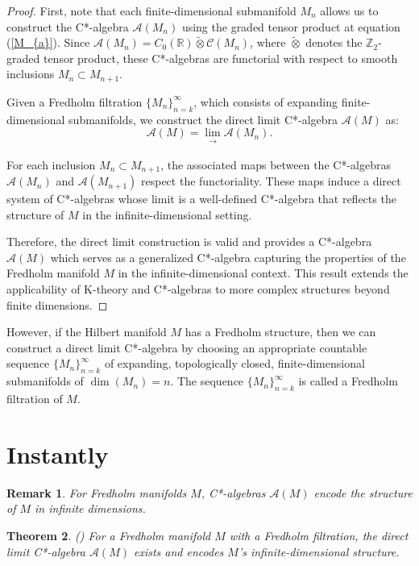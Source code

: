 \documentclass[11pt, twoside, a4paper]{article}
\theoremstyle{mytheoremstyle}
\newtheorem{theorem}{Theorem}[section]
\newtheorem{remark}[theorem]{Remark}
\begin{document}
\begin{proof}
First, note that each finite-dimensional submanifold \( M_{n} \) allows us to construct the C*-algebra \( \mathcal{A}(M_{n}) \) using the graded tensor product at equation ({\color{blue}\ref{M_{a}}}). Since \( \mathcal{A}(M_{n}) = C_{0}(\mathbb{R}) \widetilde{\otimes} 
 \mathcal{C}(M_{n}) \), where \( \widetilde{\otimes} \) denotes the \(\mathbb{Z}_{2}\)-graded tensor product, these C*-algebras are functorial with respect to smooth inclusions \( M_{n} \subset M_{n+1} \).

Given a Fredholm filtration \( \{M_{n}\}_{n=k}^{\infty} \), which consists of expanding finite-dimensional submanifolds, we construct the direct limit C*-algebra \( \mathcal{A}(M) \) as:
\[
\mathcal{A}(M) = \lim_{\substack{\to}} \mathcal{A}(M_{n}).
\]

For each inclusion \( M_{n} \subset M_{n+1} \), the associated maps between the C*-algebras \( \mathcal{A}(M_{n}) \) and \( \mathcal{A}(M_{n+1}) \) respect the functoriality. These maps induce a direct system of C*-algebras whose limit is a well-defined C*-algebra that reflects the structure of \( M \) in the infinite-dimensional setting.

Therefore, the direct limit construction is valid and provides a C*-algebra \( \mathcal{A}(M) \) which serves as a generalized C*-algebra capturing the properties of the Fredholm manifold \( M \) in the infinite-dimensional context. This result extends the applicability of K-theory and C*-algebras to more complex structures beyond finite dimensions.
\end{proof}
However, if the Hilbert manifold \(M\) has a Fredholm structure, then we can construct a direct limit C*-algebra by choosing an appropriate countable sequence \(\{M_{n}\}_{n=k}^{\infty}\) of expanding, topologically closed, finite-dimensional submanifolds of \(\operatorname{dim}(M_{n}) = n\). The sequence \(\{M_{n}\}_{n=k}^{\infty}\) is called a Fredholm filtration of \(M\). 
\section{Instantly}

\begin{remark}
For Fredholm manifolds \( M \), C*-algebras \( \mathcal{A}(M) \) encode the structure of \( M \) in infinite dimensions.
\end{remark}

\begin{theorem} ({\color{blue}\cite{higson2001}})
For a Fredholm manifold \( M \) with a Fredholm filtration, the direct limit C*-algebra \( \mathcal{A}(M) \) exists and encodes \( M \)'s infinite-dimensional structure.
\end{theorem}
\end{document}
